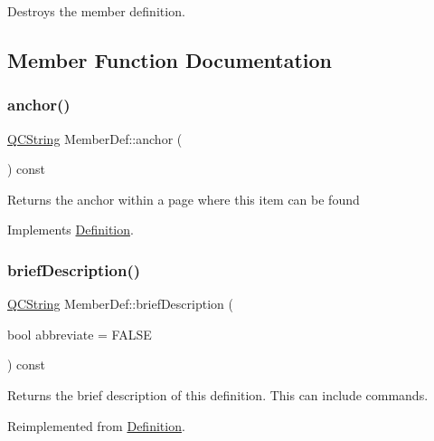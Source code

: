 Destroys the member definition. 

\subsection{Member Function Documentation}
\mbox{\label{class_member_def_a1ef7c726fdd0f1dd2d006782dd6f766a}} 
\subsubsection{\texorpdfstring{anchor()}{anchor()}}
{\footnotesize\ttfamily \mbox{\hyperlink{class_q_c_string}{Q\+C\+String}} Member\+Def\+::anchor (\begin{DoxyParamCaption}{ }\end{DoxyParamCaption}) const\hspace{0.3cm}{\ttfamily [virtual]}}

Returns the anchor within a page where this item can be found 

Implements \mbox{\hyperlink{class_definition_a56e91f9b76f41208a22cfb2336871604}{Definition}}.

\mbox{\label{class_member_def_ab4ad34e63730bc94f076b920b3b9084e}} 
\subsubsection{\texorpdfstring{briefDescription()}{briefDescription()}}
{\footnotesize\ttfamily \mbox{\hyperlink{class_q_c_string}{Q\+C\+String}} Member\+Def\+::brief\+Description (\begin{DoxyParamCaption}\item[{bool}]{abbreviate = {\ttfamily FALSE} }\end{DoxyParamCaption}) const\hspace{0.3cm}{\ttfamily [virtual]}}

Returns the brief description of this definition. This can include commands. 

Reimplemented from \mbox{\hyperlink{class_definition_a5c10fdd766133b46d61d28a77b65426e}{Definition}}.

\mbox{\label{class_member_def_a0c16b4d5effd11dbf337ece47b0d7463}} 
